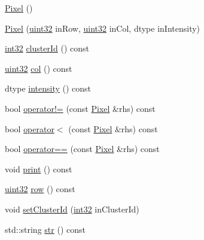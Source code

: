 \begin{DoxyCompactItemize}
\item 
\mbox{\hyperlink{class_num_c_1_1_image_processing_1_1_pixel_a7a5c740eefbeab2a6e6ed4fbffbb2f04}{Pixel}} ()
\item 
\mbox{\hyperlink{class_num_c_1_1_image_processing_1_1_pixel_a6a0dcc75ec4ff6b952685627a76475dd}{Pixel}} (\mbox{\hyperlink{namespace_num_c_ae685802ca6d3035f2b400b081e3953fa}{uint32}} in\+Row, \mbox{\hyperlink{namespace_num_c_ae685802ca6d3035f2b400b081e3953fa}{uint32}} in\+Col, dtype in\+Intensity)
\item 
\mbox{\hyperlink{namespace_num_c_aa5a7e69266097d55816d4cdb19542b53}{int32}} \mbox{\hyperlink{class_num_c_1_1_image_processing_1_1_pixel_afca989f4165310288cab0d5295963f4f}{cluster\+Id}} () const
\item 
\mbox{\hyperlink{namespace_num_c_ae685802ca6d3035f2b400b081e3953fa}{uint32}} \mbox{\hyperlink{class_num_c_1_1_image_processing_1_1_pixel_a1819a3d5224c879ed100e20f354aa722}{col}} () const
\item 
dtype \mbox{\hyperlink{class_num_c_1_1_image_processing_1_1_pixel_a614d9061c2a04982883d977642ad5852}{intensity}} () const
\item 
bool \mbox{\hyperlink{class_num_c_1_1_image_processing_1_1_pixel_a182ba7349c947cbb84535a3d08bbdc1c}{operator!=}} (const \mbox{\hyperlink{class_num_c_1_1_image_processing_1_1_pixel}{Pixel}} \&rhs) const
\item 
bool \mbox{\hyperlink{class_num_c_1_1_image_processing_1_1_pixel_a27f73437f8fa291fcb16c4928cf24a8b}{operator$<$}} (const \mbox{\hyperlink{class_num_c_1_1_image_processing_1_1_pixel}{Pixel}} \&rhs) const
\item 
bool \mbox{\hyperlink{class_num_c_1_1_image_processing_1_1_pixel_ab99d24ca953870794f9d0e2d35a49679}{operator==}} (const \mbox{\hyperlink{class_num_c_1_1_image_processing_1_1_pixel}{Pixel}} \&rhs) const
\item 
void \mbox{\hyperlink{class_num_c_1_1_image_processing_1_1_pixel_ab66e64a517458415dcbd4c2e227c494c}{print}} () const
\item 
\mbox{\hyperlink{namespace_num_c_ae685802ca6d3035f2b400b081e3953fa}{uint32}} \mbox{\hyperlink{class_num_c_1_1_image_processing_1_1_pixel_a436cfd82dc144afa2d3cfe134bc872fd}{row}} () const
\item 
void \mbox{\hyperlink{class_num_c_1_1_image_processing_1_1_pixel_a87855b80b4b6daa9ee191b3b36d3070f}{set\+Cluster\+Id}} (\mbox{\hyperlink{namespace_num_c_aa5a7e69266097d55816d4cdb19542b53}{int32}} in\+Cluster\+Id)
\item 
std\+::string \mbox{\hyperlink{class_num_c_1_1_image_processing_1_1_pixel_afbed86453c85c54a480240b0755e51be}{str}} () const
\end{DoxyCompactItemize}
